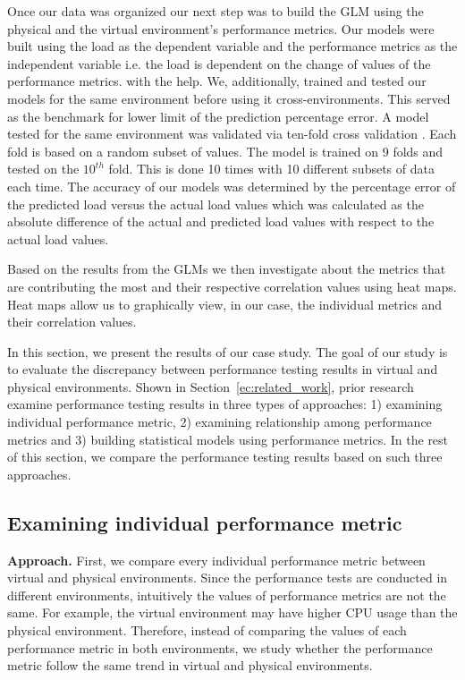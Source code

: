 Once our data was organized our next step was to build the GLM using the physical and the virtual environment's performance metrics. Our models were built using the load as the dependent variable and the performance metrics as the independent variable i.e. the load is dependent on the change of values of the performance metrics. with the help. We, additionally, trained and tested our models for the same environment before using it cross-environments. This served as the benchmark for lower limit of the prediction percentage error. A model tested for the same environment was validated via ten-fold cross validation \cite{Cross_Validation} \cite{kohavi1995study}. Each fold is based on a random subset of values. The model is trained on 9 folds and tested on the $10^{th}$ fold. This is done 10 times with 10 different subsets of data each time. The accuracy of our models was determined by the percentage error of the predicted load versus the actual load values which was calculated as the absolute difference of the actual and predicted load values with respect to the actual load values.

Based on the results from the GLMs we then investigate about the metrics that are contributing the most and their respective correlation values using heat maps. Heat maps allow us to graphically view, in our case, the individual metrics and their correlation values. 


In this section, we present the results of our case study. The goal of our study is to evaluate the discrepancy between performance testing results in virtual and physical environments. Shown in Section~\ref{ec:related_work}, prior research examine performance testing results in three types of approaches: 1) examining individual performance metric, 2) examining relationship among performance metrics and 3) building statistical models using performance metrics. In the rest of this section, we compare the performance testing results based on such three approaches.

\subsection{Examining individual performance metric}
\label{sec:individual}

\noindent \textbf{Approach.} First, we compare every individual performance metric between virtual and physical environments. Since the performance tests are conducted in different environments, intuitively the values of performance metrics are not the same. For example, the virtual environment may have higher CPU usage than the physical environment. Therefore, instead of comparing the values of each performance metric in both environments, we study whether the performance metric follow the same trend in virtual and physical environments. 

